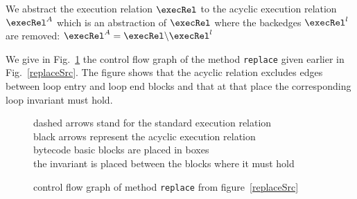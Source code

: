 We abstract the execution relation $\execRel$ to the acyclic execution relation $\execRel^A$ which is an abstraction of $\execRel$ where the backedges $ \execRel^l$ are removed: $\execRel^A = \execRel \backslash \execRel^l$



We give in Fig.~\ref{blockBC} the control flow graph of the method \texttt{replace} given earlier in Fig.~\ref{replaceSrc}. The figure shows that the acyclic relation
excludes edges between loop entry and loop end blocks and that at that place the corresponding loop invariant must hold.  

\begin{figure}
\begin{center}
\end{center}
dashed arrows stand for the standard execution relation \\ 
black arrows represent the acyclic execution relation \\
bytecode basic blocks are placed in boxes \\
the invariant is placed between the blocks where it must hold
\caption{control flow graph of method \texttt{replace} from figure~\ref{replaceSrc} }
\label{blockBC}
\end{figure}


